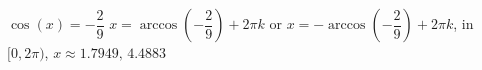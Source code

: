  {$\cos(x) = -\dfrac{2}{9}$}
{ $x = \arccos\left(-\dfrac{2}{9}\right) + 2\pi k$ or $x = - \arccos\left(-\dfrac{2}{9}\right) + 2\pi k$, in  $[0, 2\pi)$, $x \approx 1.7949, \, 4.4883$}
